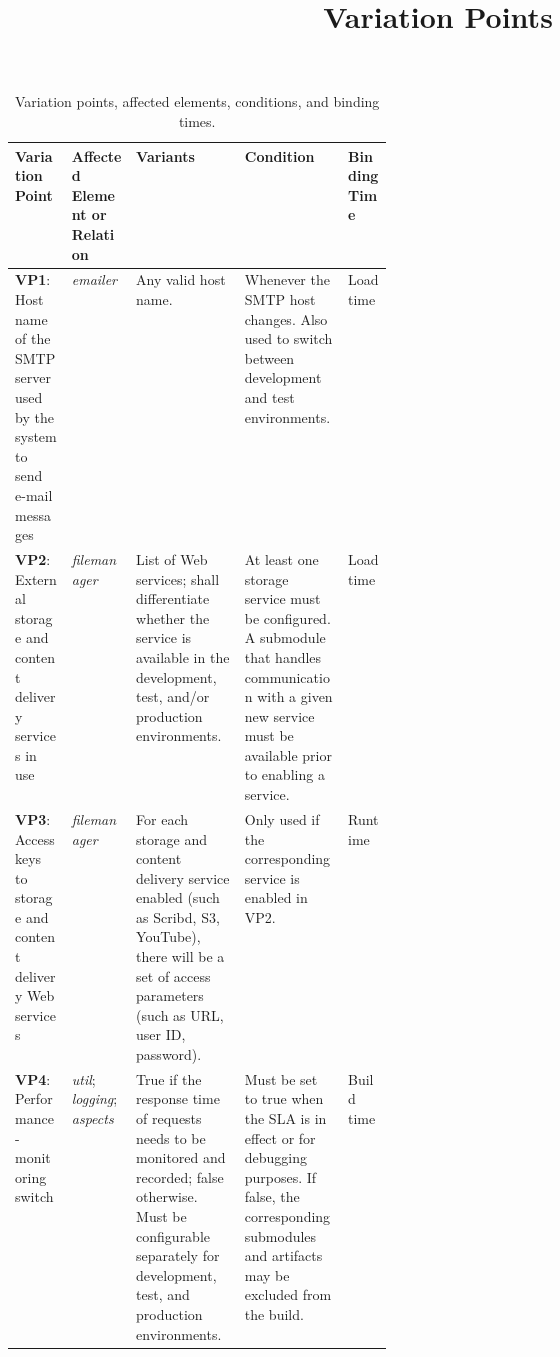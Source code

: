 \documentclass[11pt]{article}
\begin{document}
\title{Variation Points}
\author{}
\date{}
\maketitle

\begin{table}[h!]
  \centering
  \small
  \begin{tabularx}{\linewidth}{@{}L{0.15\linewidth} L{0.17\linewidth} >{\raggedright\arraybackslash}X >{\raggedright\arraybackslash}X L{0.12\linewidth}@{}}
    \toprule
    \textbf{Variation Point} &
    \textbf{Affected Element or Relation} &
    \textbf{Variants} &
    \textbf{Condition} &
    \textbf{Binding Time} \\
    \midrule
    \textbf{VP1}: Host name of the SMTP server used by the system to send e-mail messages
      & \textit{emailer}
      & Any valid host name.
      & Whenever the SMTP host changes. Also used to switch between development and test environments.
      & Load time \\
    \midrule
    \textbf{VP2}: External storage and content delivery services in use
      & \textit{filemanager}
      & List of Web services; shall differentiate whether the service is available in the development, test, and/or production environments.
      & At least one storage service must be configured. A submodule that handles communication with a given new service must be available prior to enabling a service.
      & Load time \\
    \midrule
    \textbf{VP3}: Access keys to storage and content delivery Web services
      & \textit{filemanager}
      & For each storage and content delivery service enabled (such as Scribd, S3, YouTube), there will be a set of access parameters (such as URL, user ID, password).
      & Only used if the corresponding service is enabled in VP2.
      & Runtime \\
    \midrule
    \textbf{VP4}: Performance-monitoring switch
      & \textit{util}; \textit{logging}; \textit{aspects}
      & True if the response time of requests needs to be monitored and recorded; false otherwise. Must be configurable separately for development, test, and production environments.
      & Must be set to true when the SLA is in effect or for debugging purposes. If false, the corresponding submodules and artifacts may be excluded from the build.
      & Build time \\
    \bottomrule
  \end{tabularx}
  \caption{Variation points, affected elements, conditions, and binding times.}
\end{table}
\end{document}
